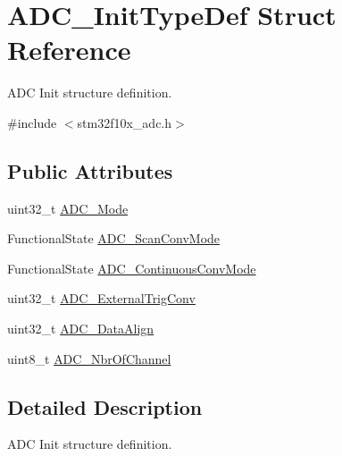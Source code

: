 \hypertarget{structADC__InitTypeDef}{
\section{ADC\_\-InitTypeDef Struct Reference}
\label{structADC__InitTypeDef}
}


ADC Init structure definition.  




{\ttfamily \#include $<$stm32f10x\_\-adc.h$>$}

\subsection*{Public Attributes}
\begin{DoxyCompactItemize}
\item 
uint32\_\-t \hyperlink{structADC__InitTypeDef_a0f9ec17ad585d66a54625213062c9260}{ADC\_\-Mode}
\item 
FunctionalState \hyperlink{structADC__InitTypeDef_aaf44f54f22ab40bf8fae01f075aa4c87}{ADC\_\-ScanConvMode}
\item 
FunctionalState \hyperlink{structADC__InitTypeDef_a2149036a332281e70a36879a2396b8d1}{ADC\_\-ContinuousConvMode}
\item 
uint32\_\-t \hyperlink{structADC__InitTypeDef_ae5d0c48e70c2a39355b7ab0cc1df8310}{ADC\_\-ExternalTrigConv}
\item 
uint32\_\-t \hyperlink{structADC__InitTypeDef_a622e89d8fba3900f20aaf40d5560ab7b}{ADC\_\-DataAlign}
\item 
uint8\_\-t \hyperlink{structADC__InitTypeDef_ad6f39a12ac32a2767085ac94e9338bc3}{ADC\_\-NbrOfChannel}
\end{DoxyCompactItemize}


\subsection{Detailed Description}
ADC Init structure definition. 

